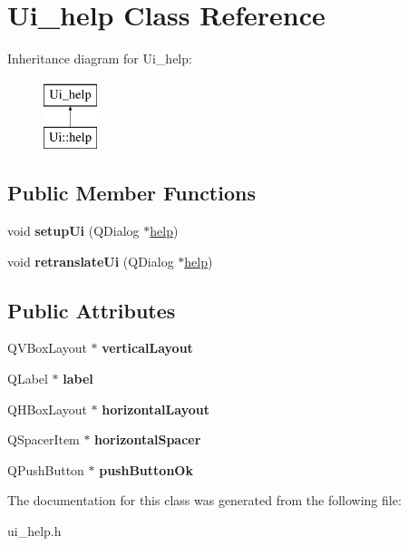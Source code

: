 \hypertarget{classUi__help}{\section{Ui\-\_\-help Class Reference}
\label{classUi__help}
}
Inheritance diagram for Ui\-\_\-help\-:\begin{figure}[H]
\begin{center}
\leavevmode
\includegraphics[height=2.000000cm]{classUi__help}
\end{center}
\end{figure}
\subsection*{Public Member Functions}
\begin{DoxyCompactItemize}
\item 
\hypertarget{classUi__help_a4b1ab1bb9e72c9cadb00adf41be9ed0c}{void {\bfseries setup\-Ui} (Q\-Dialog $\ast$\hyperlink{classhelp}{help})}\label{classUi__help_a4b1ab1bb9e72c9cadb00adf41be9ed0c}

\item 
\hypertarget{classUi__help_aa206e4e7e7ed5622b8ec847f7f43c484}{void {\bfseries retranslate\-Ui} (Q\-Dialog $\ast$\hyperlink{classhelp}{help})}\label{classUi__help_aa206e4e7e7ed5622b8ec847f7f43c484}

\end{DoxyCompactItemize}
\subsection*{Public Attributes}
\begin{DoxyCompactItemize}
\item 
\hypertarget{classUi__help_ac1a3b742bcbdbc9e70a5e6e08adbb4e8}{Q\-V\-Box\-Layout $\ast$ {\bfseries vertical\-Layout}}\label{classUi__help_ac1a3b742bcbdbc9e70a5e6e08adbb4e8}

\item 
\hypertarget{classUi__help_af99c4c1b7bfbb43884cd3596f02528b3}{Q\-Label $\ast$ {\bfseries label}}\label{classUi__help_af99c4c1b7bfbb43884cd3596f02528b3}

\item 
\hypertarget{classUi__help_ae47b0270992783a661fb371d0addefc5}{Q\-H\-Box\-Layout $\ast$ {\bfseries horizontal\-Layout}}\label{classUi__help_ae47b0270992783a661fb371d0addefc5}

\item 
\hypertarget{classUi__help_a417e3c081fd384c5c48d0c6b5a4046ce}{Q\-Spacer\-Item $\ast$ {\bfseries horizontal\-Spacer}}\label{classUi__help_a417e3c081fd384c5c48d0c6b5a4046ce}

\item 
\hypertarget{classUi__help_a983ef178586664d76676080244d903b2}{Q\-Push\-Button $\ast$ {\bfseries push\-Button\-Ok}}\label{classUi__help_a983ef178586664d76676080244d903b2}

\end{DoxyCompactItemize}


The documentation for this class was generated from the following file\-:\begin{DoxyCompactItemize}
\item 
ui\-\_\-help.\-h\end{DoxyCompactItemize}
